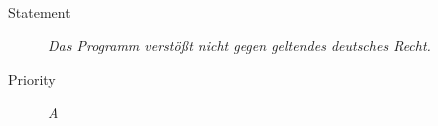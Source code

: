 \paragraph{}
\begin{description}
\item[Statement] \textit{Das Programm verstößt nicht gegen geltendes deutsches Recht.}
\item[Priority] \textit{A}
\end{description}
